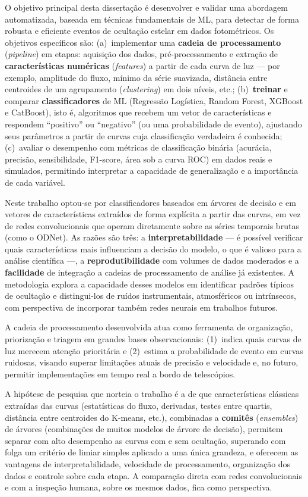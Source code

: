 O objetivo principal desta dissertação é desenvolver e validar uma abordagem automatizada, baseada em técnicas fundamentais de ML, para detectar de forma robusta e eficiente eventos de ocultação estelar em dados fotométricos. Os objetivos específicos são: (a)~implementar uma \textbf{cadeia de processamento} (\textit{pipeline}) em etapas: aquisição dos dados, pré-processamento e extração de \textbf{características numéricas} (\textit{features}) a partir de cada curva de luz --- por exemplo, amplitude do fluxo, mínimo da série suavizada, distância entre centroides de um agrupamento (\textit{clustering}) em dois níveis, etc.; (b)~\textbf{treinar} e comparar \textbf{classificadores} de ML (Regressão Logística, Random Forest, XGBoost e CatBoost), isto é, algoritmos que recebem um vetor de características e respondem ``positivo'' ou ``negativo'' (ou uma probabilidade de evento), ajustando seus parâmetros a partir de curvas cuja classificação verdadeira é conhecida; (c)~avaliar o desempenho com métricas de classificação binária (acurácia, precisão, sensibilidade, F1-score, área sob a curva ROC) em dados reais e simulados, permitindo interpretar a capacidade de generalização e a importância de cada variável.

Neste trabalho optou-se por classificadores baseados em árvores de decisão e em vetores de características extraídos de forma explícita a partir das curvas, em vez de redes convolucionais que operam diretamente sobre as séries temporais brutas (como o ODNet). As razões são três: a \textbf{interpretabilidade} --- é possível verificar quais características mais influenciam a decisão do modelo, o que é valioso para a análise científica ---, a \textbf{reprodutibilidade} com volumes de dados moderados e a \textbf{facilidade} de integração a cadeias de processamento de análise já existentes. A metodologia explora a capacidade desses modelos em identificar padrões típicos de ocultação e distingui-los de ruídos instrumentais, atmosféricos ou intrínsecos, com perspectiva de incorporar também redes neurais em trabalhos futuros. 

A cadeia de processamento desenvolvida atua como ferramenta de organização, priorização e triagem em grandes bases observacionais: (1)~indica quais curvas de luz merecem atenção prioritária e (2)~estima a probabilidade de evento em curvas ruidosas, visando superar limitações atuais de precisão e velocidade e, no futuro, permitir implementações em tempo real a bordo de telescópios.

A hipótese de pesquisa que norteia o trabalho é a de que características clássicas extraídas das curvas (estatísticas do fluxo, derivadas, testes entre quartis, distância entre centroides do K-means, etc.), combinadas a \textbf{comitês} (\textit{ensembles}) de árvores (combinações de muitos modelos de árvore de decisão), permitem separar com alto desempenho as curvas com e sem ocultação, superando com folga um critério de limiar simples aplicado a uma única grandeza, e oferecem as vantagens de interpretabilidade, velocidade de processamento, organização dos dados e controle sobre cada etapa. A comparação direta com redes convolucionais e com a inspeção humana, sobre os mesmos dados, fica como perspectiva.

